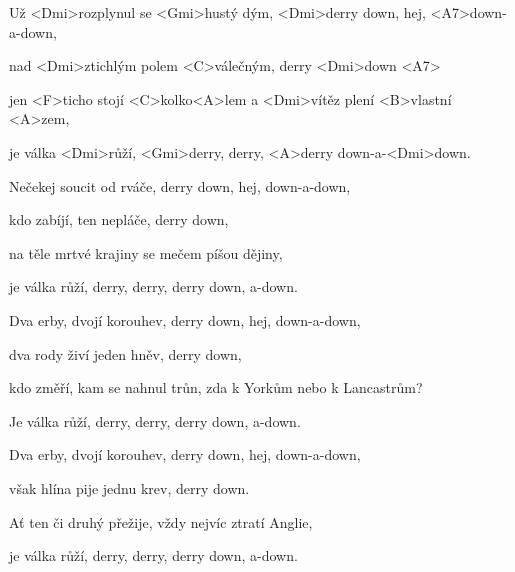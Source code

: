 
\zs
Už <Dmi>rozplynul se <Gmi>hustý dým, <Dmi>derry down, hej, <A7>down-a-down, 

nad <Dmi>ztichlým polem <C>válečným, derry <Dmi>down <A7> 

jen <F>ticho stojí <C>kolko<A>lem a <Dmi>vítěz plení <B>vlastní <A>zem, 

je válka <Dmi>růží, <Gmi>derry, derry, <A>derry down-a-<Dmi>down. \ks

\zs
Nečekej soucit od rváče, derry down, hej, down-a-down, 

kdo zabíjí, ten nepláče, derry down, 

na těle mrtvé krajiny se mečem píšou dějiny, 

je válka růží, derry, derry, derry down, a-down.
\ks

\zs
Dva erby, dvojí korouhev, derry down, hej, down-a-down, 

dva rody živí jeden hněv, derry down, 

kdo změří, kam se nahnul trůn, zda k Yorkům nebo k Lancastrům?

Je válka růží, derry, derry, derry down, a-down.
\ks

\zs
Dva erby, dvojí korouhev, derry down, hej, down-a-down, 

však hlína pije jednu krev, derry down.

Ať ten či druhý přežije, vždy nejvíc ztratí Anglie, 

je válka růží, derry, derry, derry down, a-down.
\ks
\kp
